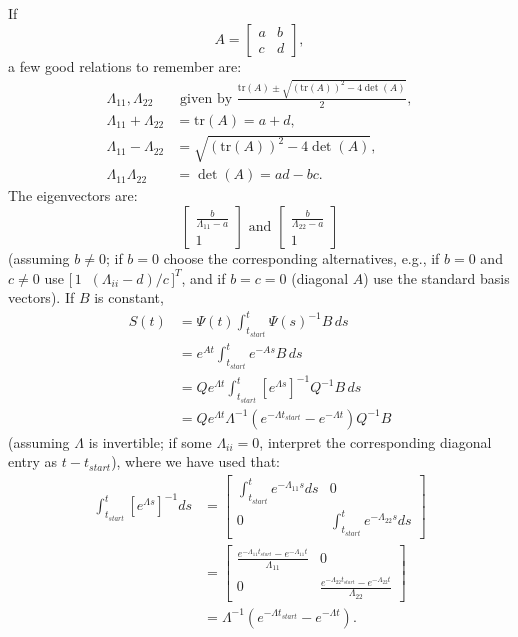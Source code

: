 \documentclass[../../lecture_notes.tex]{subfiles}
\begin{document}
If
\begin{equation*}
  A=\left[
  \begin{array}{cc}
    a & b \\
    c & d
  \end{array}
  \right],
\end{equation*}
a few good relations to remember are:
\begin{align*}
  \Lambda_{11},\Lambda_{22}& \text{ given by } \frac{\mathrm{tr}(A)\pm \sqrt{(\mathrm{tr}(A))^{2}-4\det(A)}}{2}, \\
  \Lambda_{11}+\Lambda_{22} &=\mathrm{tr}(A)=a+d, \\
  \Lambda_{11}-\Lambda_{22} &=\sqrt{(\mathrm{tr}(A))^{2}-4\det(A)}, \\
  \Lambda_{11}\Lambda_{22} &=\det(A)=ad-bc.
\end{align*}
The eigenvectors are:
\begin{equation*}
  \left[
  \begin{array}{c}
    \frac{b}{\Lambda_{11}-a} \\
    1
  \end{array}
  \right] \text{ and }
  \left[
  \begin{array}{c}
    \frac{b}{\Lambda_{22}-a} \\
    1
  \end{array}
  \right]
\end{equation*}
(assuming \(b\ne 0\); if \(b=0\) choose the corresponding alternatives, e.g., if \(b=0\) and \(c\ne 0\)
use \(\bigl[\,1\;\; (\Lambda_{ii}-d)/c\,\bigr]^T\), and if \(b=c=0\) (diagonal \(A\)) use the standard basis vectors).
If \(B\) is constant,
\begin{align*}
  S(t) &=\Psi(t)\int_{t_{start}}^{t}\Psi(s)^{-1}B\,ds \\
  &=e^{At}\int_{t_{start}}^{t}e^{-As}B\,ds \\
  &=Qe^{\Lambda t}\int_{t_{start}}^{t}\left[ e^{\Lambda s}\right]^{-1}Q^{-1}B\,ds \\
  &=Qe^{\Lambda t}\Lambda^{-1}\left( e^{-\Lambda t_{start}}-e^{-\Lambda t}\right) Q^{-1}B
\end{align*}
(assuming \(\Lambda\) is invertible; if some \(\Lambda_{ii}=0\), interpret the corresponding diagonal entry as \(t-t_{start}\)), where we have used that:
\begin{align*}
  \int_{t_{start}}^{t}\left[ e^{\Lambda s}\right]^{-1}ds &=\left[
  \begin{array}{cc}
    \int_{t_{start}}^{t}e^{-\Lambda_{11}s}ds & 0 \\
    0 & \int_{t_{start}}^{t}e^{-\Lambda_{22}s}ds
  \end{array}
  \right] \\
  &=\left[
  \begin{array}{cc}
    \frac{e^{-\Lambda_{11}t_{start}}-e^{-\Lambda_{11}t}}{\Lambda_{11}} & 0 \\
    0 & \frac{e^{-\Lambda_{22}t_{start}}-e^{-\Lambda_{22}t}}{\Lambda_{22}}
  \end{array}
  \right] \\
  &=\Lambda^{-1}\left( e^{-\Lambda t_{start}}-e^{-\Lambda t}\right).
\end{align*}
\end{document}
